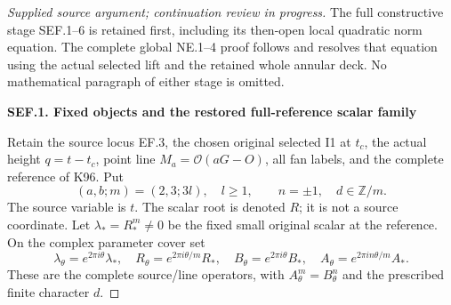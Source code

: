 \begin{proof}[Supplied source argument; continuation review in progress]

\par\noindent
The full constructive stage SEF.1--6 is retained first, including
its then-open local quadratic norm equation. The complete global
NE.1--4 proof follows and resolves that equation using the actual
selected lift and the retained whole annular deck. No mathematical
paragraph of either stage is omitted.

\par

\medskip\noindent\textbf{SEF.1. Fixed objects and the restored full-reference scalar family}

\par\nobreak

Retain the source locus EF.3, the chosen original selected I1 at \(t_c\),
the actual height \(q=t-t_c\), point line \(M_a=\mathcal O(aG-O)\),
all fan labels, and the complete reference of K96. Put
\[
 (a,b;m)=(2,3;3l),\quad l\ge1,\qquad n=\pm1,\quad d\in\mathbb Z/m.
 \tag{SEF.1}
\]
The source variable is \(t\). The scalar root is denoted \(R\);
it is not a source coordinate. Let \(\lambda_*=R_*^m\ne0\) be
the fixed small original scalar at the reference. On the complex
parameter cover set
\[
 \lambda_\theta=e^{2\pi i\theta}\lambda_*,\quad
 R_\theta=e^{2\pi i\theta/m}R_*,\quad
 B_\theta=e^{2\pi i\theta}B_*,\quad
 A_\theta=e^{2\pi i n\theta/m}A_* .
 \tag{SEF.2}
\]
These are the complete source/line operators, with
\(A_\theta^m=B_\theta^n\) and the prescribed finite character \(d\).


\end{proof}
